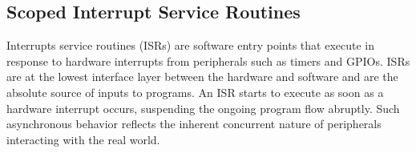 \documentclass[sigplan,10pt,review,anonymous]{acmart}\settopmatter{printfolios=true,printccs=false,printacmref=false}
\newcommand{\CEU}{\textsc{C\'{e}u}\xspace}
\begin{document}

\subsection{Scoped Interrupt Service Routines}
\label{sec.isrs}

Interrupts service routines (ISRs) are software entry points that execute in
response to hardware interrupts from peripherals such as timers and GPIOs.
ISRs are at the lowest interface layer between the hardware and software and
are the absolute source of inputs to programs.
%
An ISR starts to execute as soon as a hardware interrupt occurs, suspending
the ongoing program flow abruptly.
Such asynchronous behavior reflects the inherent concurrent nature of
peripherals interacting with the real world.

\end{document}
